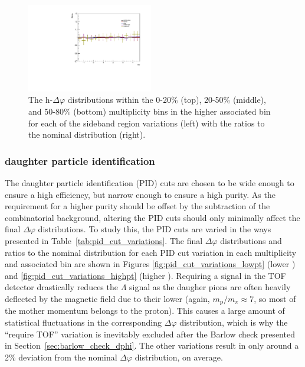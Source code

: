 \begin{figure}[ht]
    \includegraphics[width=0.49\textwidth]{figures/analysis/sideband_variations_dphi_50_80_highpt_ratio.pdf}
    \caption{The h-\lmb $\Delta\varphi$ distributions within the 0-20\% (top), 20-50\% (middle), and 50-80\% (bottom) multiplicity bins in the higher associated \pt bin for each of the sideband region variations (left) with the ratios to the nominal distribution (right).}
    \label{fig:sideband_region_variations_highpt}
\end{figure}

\subsubsection{\lmb daughter particle identification}
The \lmb daughter particle identification (PID) cuts are chosen to be wide enough to ensure a high efficiency, but narrow enough to ensure a high purity. As the requirement for a higher purity should be offset by the subtraction of the combinatorial background, altering the PID cuts should only minimally affect the final $\Delta\varphi$ distributions. To study this, the PID cuts are varied in the ways presented in Table~\ref{tab:pid_cut_variations}. The final $\Delta\varphi$ distributions and ratios to the nominal distribution for each PID cut variation in each multiplicity and associated \pt bin are shown in Figures \ref{fig:pid_cut_variations_lowpt} (lower \pt) and \ref{fig:pid_cut_variations_highpt} (higher \pt). Requiring a signal in the TOF detector drastically reduces the $\Lambda$ signal as the daugher pions are often heavily deflected by the magnetic field due to their lower \pt (again, $m_{\text{p}}/m_{\pi} \approx 7$, so most of the mother momentum belongs to the proton). This causes a large amount of statistical fluctuations in the corresponding $\Delta\varphi$ distribution, which is why the ``require TOF'' variation is inevitably excluded after the Barlow check presented in Section~\ref{sec:barlow_check_dphi}. The other variations result in only around a 2\% deviation from the nominal $\Delta\varphi$ distribution, on average.

